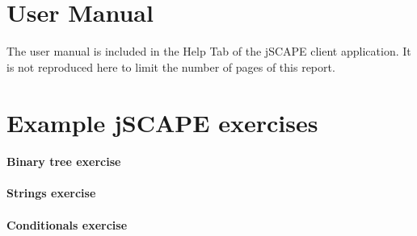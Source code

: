 \appendix
\chapter{User Manual}
The user manual is included in the Help Tab of the jSCAPE client application. It is not reproduced here to limit the number of pages of this report.

\chapter{Example jSCAPE exercises}
\label{chap:example-jscape-exercises}

\subsubsection{Binary tree exercise}


\subsubsection{Strings exercise}


\subsubsection{Conditionals exercise}
